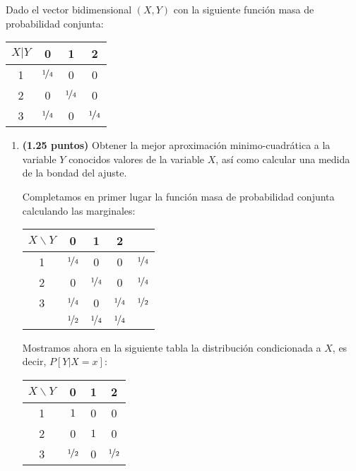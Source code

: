 \documentclass[12pt]{article}
\begin{document}
    \begin{ejercicio}
        Dado el vector bidimensional $(X,Y)$ con la siguiente función masa de probabilidad conjunta:
        \begin{table}[H]
        \centering
        \begin{tabular}{|c|ccc|}
            \hline
            $X|Y$ & 0 & 1 & 2 \\
            \hline
            1 & $\nicefrac{1}{4}$ & 0 & 0 \\
            2 & 0 & $\nicefrac{1}{4}$ & 0 \\
            3 & $\nicefrac{1}{4}$ & 0 & $\nicefrac{1}{4}$ \\
            \hline
        \end{tabular}
        \end{table}
        \begin{enumerate}
            \item \textbf{(1.25 puntos)} Obtener la mejor aproximación minimo-cuadrática a la variable $Y$ conocidos valores de la variable $X$, así como calcular una medida de la bondad del ajuste.
            
            Completamos en primer lugar la función masa de probabilidad conjunta calculando las marginales:
            \begin{table}[H]
                \centering
                \begin{tabular}{c|ccc||c}
                    $X\backslash Y$ & 0 & 1 & 2 \\
                    \hline
                    1 & $\nicefrac{1}{4}$ & 0 & 0 & $\nicefrac{1}{4}$\\
                    2 & 0 & $\nicefrac{1}{4}$ & 0 & $\nicefrac{1}{4}$ \\
                    3 & $\nicefrac{1}{4}$ & 0 & $\nicefrac{1}{4}$ & $\nicefrac{1}{2}$ \\ \hline
                    \hline
                    & $\nicefrac{1}{2}$ & $\nicefrac{1}{4}$ & $\nicefrac{1}{4}$
                \end{tabular}
                \end{table}
            
            Mostramos ahora en la siguiente tabla la distribución condicionada a $X$, es decir, $P[Y|X=x]$:
            \begin{table}[H]
            \centering
            \begin{tabular}{c|ccc}
                $X\backslash Y$ & 0 & 1 & 2 \\
                \hline
                1 & $1$ & 0 & 0 \\
                2 & 0 & $1$ & 0 \\
                3 & $\nicefrac{1}{2}$ & 0 & $\nicefrac{1}{2}$
            \end{tabular}
            \end{table}


\end{enumerate}
\end{ejercicio}
\end{document}
